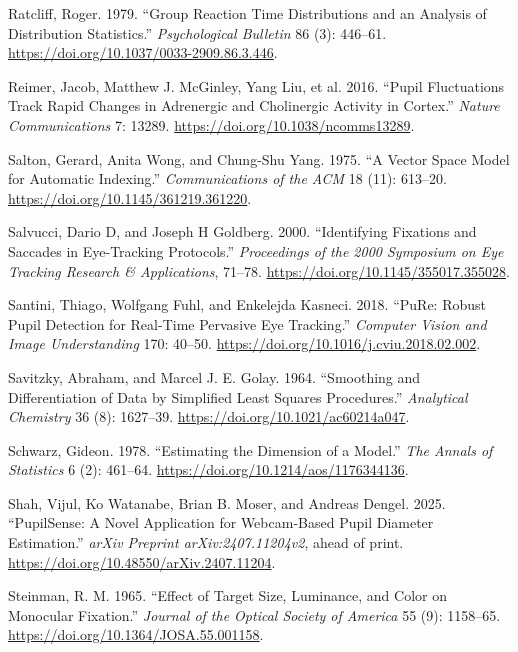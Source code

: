 \documentclass[
]{article}
\newlength{\cslhangindent}
\newenvironment{CSLReferences}[2] %
 {\begin{list}{}{%
  \setlength{\itemindent}{0pt}
  \setlength{\leftmargin}{0pt}
  \setlength{\parsep}{0pt}
  \ifodd #1
   \setlength{\leftmargin}{\cslhangindent}
   \setlength{\itemindent}{-1\cslhangindent}
  \fi
  \setlength{\itemsep}{#2\baselineskip}}}
 {\end{list}}
\begin{document}
\begin{CSLReferences}{1}{1}
Ratcliff, Roger. 1979. {``Group Reaction Time Distributions and an
Analysis of Distribution Statistics.''} \emph{Psychological Bulletin} 86
(3): 446--61. \url{https://doi.org/10.1037/0033-2909.86.3.446}.

Reimer, Jacob, Matthew J. McGinley, Yang Liu, et al. 2016. {``Pupil
Fluctuations Track Rapid Changes in Adrenergic and Cholinergic Activity
in Cortex.''} \emph{Nature Communications} 7: 13289.
\url{https://doi.org/10.1038/ncomms13289}.

Salton, Gerard, Anita Wong, and Chung-Shu Yang. 1975. {``A Vector Space
Model for Automatic Indexing.''} \emph{Communications of the ACM} 18
(11): 613--20. \url{https://doi.org/10.1145/361219.361220}.

Salvucci, Dario D, and Joseph H Goldberg. 2000. {``Identifying Fixations
and Saccades in Eye-Tracking Protocols.''} \emph{Proceedings of the 2000
Symposium on Eye Tracking Research \& Applications}, 71--78.
\url{https://doi.org/10.1145/355017.355028}.

Santini, Thiago, Wolfgang Fuhl, and Enkelejda Kasneci. 2018. {``PuRe:
Robust Pupil Detection for Real-Time Pervasive Eye Tracking.''}
\emph{Computer Vision and Image Understanding} 170: 40--50.
\url{https://doi.org/10.1016/j.cviu.2018.02.002}.

Savitzky, Abraham, and Marcel J. E. Golay. 1964. {``Smoothing and
Differentiation of Data by Simplified Least Squares Procedures.''}
\emph{Analytical Chemistry} 36 (8): 1627--39.
\url{https://doi.org/10.1021/ac60214a047}.

Schwarz, Gideon. 1978. {``Estimating the Dimension of a Model.''}
\emph{The Annals of Statistics} 6 (2): 461--64.
\url{https://doi.org/10.1214/aos/1176344136}.

Shah, Vijul, Ko Watanabe, Brian B. Moser, and Andreas Dengel. 2025.
{``PupilSense: A Novel Application for Webcam-Based Pupil Diameter
Estimation.''} \emph{arXiv Preprint arXiv:2407.11204v2}, ahead of print.
\url{https://doi.org/10.48550/arXiv.2407.11204}.

Steinman, R. M. 1965. {``Effect of Target Size, Luminance, and Color on
Monocular Fixation.''} \emph{Journal of the Optical Society of America}
55 (9): 1158--65. \url{https://doi.org/10.1364/JOSA.55.001158}.


\end{CSLReferences}
\end{document}
